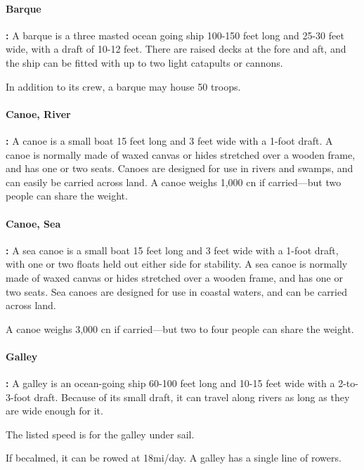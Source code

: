\begin{multicols*}{2}

\paragraph{Barque}\textbf{:} A barque is a three masted ocean going ship 100-150 feet long and 25-30 feet wide, with a draft of 10-12 feet. There are raised decks at the fore and aft, and the ship can be fitted with up to two light catapults or cannons.

In addition to its crew, a barque may house 50 troops.

\paragraph{Canoe, River}\textbf{:} A canoe is a small boat 15 feet long and 3 feet wide with a 1-foot draft. A canoe is normally made of waxed canvas or hides stretched over a wooden frame, and has one or two seats. Canoes are designed for use in rivers and swamps, and can easily be carried across land. A canoe weighs 1,000 cn if carried—but two people can share the weight.

\paragraph{Canoe, Sea}\textbf{:} A sea canoe is a small boat 15 feet long and 3 feet wide with a 1-foot draft, with one or two floats held out either side for stability. A sea canoe is normally made of waxed canvas or hides stretched over a wooden frame, and has one or two seats. Sea canoes are designed for use in coastal waters, and can be carried across land.

A canoe weighs 3,000 cn if carried—but two to four people can share the weight.

\paragraph{Galley}\textbf{:} A galley is an ocean-going ship 60-100 feet long and 10-15 feet wide with a 2-to-3-foot draft. Because of its small draft, it can travel along rivers as long as they are wide enough for it.

The listed speed is for the galley under sail.

If becalmed, it can be rowed at 18mi/day. A galley has a single line of rowers.


\end{multicols*}
